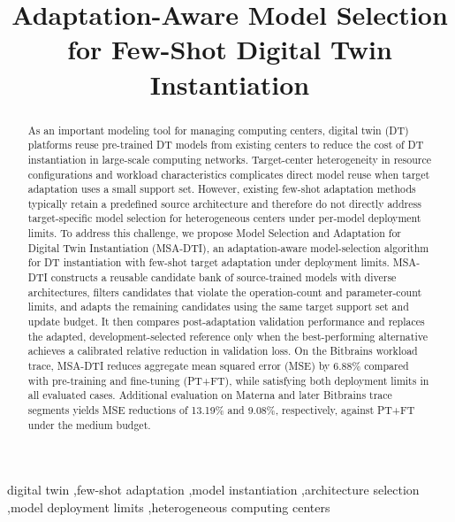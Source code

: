 \documentclass[a4paper,fleqn]{cas-sc}
\begin{document}
\setlength{\abovedisplayskip}{0pt plus 1pt minus 0pt}
\setlength{\belowdisplayskip}{5pt plus 1pt minus 1pt}
\setlength{\abovedisplayshortskip}{0pt plus 1pt minus 0pt}
\setlength{\belowdisplayshortskip}{5pt plus 1pt minus 1pt}


\title[mode=title]{Adaptation-Aware Model Selection for Few-Shot Digital Twin Instantiation}

\begin{abstract}
As an important modeling tool for managing computing centers, digital twin
(DT) platforms reuse pre-trained DT models from existing centers to reduce the
cost of DT instantiation in large-scale computing networks. Target-center
heterogeneity in resource configurations and workload characteristics
complicates direct model reuse when target adaptation uses a small support set.
However, existing few-shot adaptation methods typically retain a predefined
source architecture and therefore do not directly address target-specific
model selection for heterogeneous centers under per-model deployment limits.
To address this challenge, we propose Model Selection and Adaptation for
Digital Twin Instantiation (MSA-DTI), an adaptation-aware model-selection
algorithm for DT instantiation with few-shot target adaptation under deployment
limits. MSA-DTI constructs a reusable candidate bank of source-trained models
with diverse architectures, filters candidates that violate the operation-count
and parameter-count limits, and adapts the remaining candidates using the same
target support set and update budget. It then compares post-adaptation
validation performance and replaces the adapted, development-selected reference only when the
best-performing alternative achieves a calibrated relative reduction in
validation loss. On the Bitbrains workload trace, MSA-DTI reduces aggregate mean squared error
(MSE) by 6.88\% compared with pre-training and fine-tuning (PT+FT), while
satisfying both deployment limits in all evaluated cases. Additional evaluation
on Materna and later Bitbrains trace segments yields MSE reductions of 13.19\%
and 9.08\%, respectively, against PT+FT under the medium budget.
\end{abstract}

\begin{keywords}
digital twin
\sep few-shot adaptation
\sep model instantiation
\sep architecture selection
\sep model deployment limits
\sep heterogeneous computing centers
\end{keywords}
\end{document}
